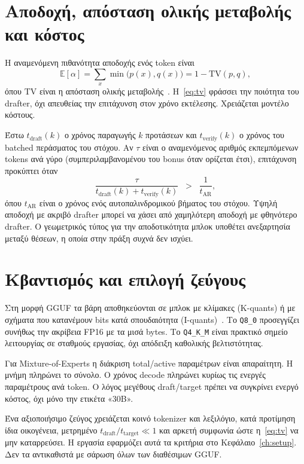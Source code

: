 \documentclass[a4paper,12pt]{report}
\theoremstyle{plain}
\theoremstyle{definition}
\theoremstyle{remark}
\begin{document}
\section{Αποδοχή, απόσταση ολικής μεταβολής και κόστος}

Η αναμενόμενη πιθανότητα αποδοχής ενός token είναι
\begin{equation}
  \mathbb{E}[\alpha]
  =\sum_{x}\min\bigl(p(x),q(x)\bigr)
  =1-\mathrm{TV}(p,q),
  \label{eq:tv}
\end{equation}
όπου \(\mathrm{TV}\) είναι η απόσταση ολικής μεταβολής~\cite{leviathan2023fast}.
Η~\eqref{eq:tv} φράσσει την ποιότητα του drafter, όχι απευθείας την επιτάχυνση
στον χρόνο εκτέλεσης. Χρειάζεται μοντέλο κόστους.

Έστω \(t_{\mathrm{draft}}(k)\) ο χρόνος παραγωγής \(k\) προτάσεων και
\(t_{\mathrm{verify}}(k)\) ο χρόνος του batched περάσματος του στόχου. Αν
\(\tau\) είναι ο αναμενόμενος αριθμός εκπεμπόμενων tokens ανά γύρο
(συμπεριλαμβανομένου του bonus όταν ορίζεται έτσι), επιτάχυνση προκύπτει όταν
\[
  \frac{\tau}{t_{\mathrm{draft}}(k)+t_{\mathrm{verify}}(k)}
  \;\;>\;\;
  \frac{1}{t_{\mathrm{AR}}},
\]
όπου \(t_{\mathrm{AR}}\) είναι ο χρόνος ενός αυτοπαλινδρομικού βήματος του
στόχου. Υψηλή αποδοχή με ακριβό drafter μπορεί να χάσει από χαμηλότερη αποδοχή
με φθηνότερο drafter. Ο γεωμετρικός τύπος για την αποδοτικότητα μπλοκ υποθέτει
ανεξαρτησία μεταξύ θέσεων, η οποία στην πράξη συχνά δεν ισχύει.

\section{Κβαντισμός και επιλογή ζεύγους}

Στη μορφή GGUF τα βάρη αποθηκεύονται σε μπλοκ με κλίμακες (K-quants) ή με
σχήματα που κατανέμουν bits κατά σπουδαιότητα (I-quants)~\cite{llamacpp}. Το
\texttt{Q8\_0} προσεγγίζει συνήθως την ακρίβεια FP16 με τα μισά bytes. Το
\texttt{Q4\_K\_M} είναι πρακτικό σημείο λειτουργίας σε σταθμούς εργασίας, όχι
απόδειξη καθολικής βελτιστότητας.

Για Mixture-of-Experts η διάκριση total/active παραμέτρων είναι απαραίτητη.
Η μνήμη πληρώνει το σύνολο. Ο χρόνος decode πληρώνει κυρίως τις ενεργές
παραμέτρους ανά token. Ο λόγος μεγέθους draft/target πρέπει να συγκρίνει
ενεργό κόστος, όχι μόνο την ετικέτα «30B».

Ένα αξιοποιήσιμο ζεύγος χρειάζεται κοινό tokenizer και λεξιλόγιο, κατά
προτίμηση ίδια οικογένεια, μετρημένο \(t_{\mathrm{draft}}/t_{\mathrm{target}}
\ll 1\) και αρκετή συμφωνία ώστε η~\eqref{eq:tv} να μην καταρρεύσει. Η
εργασία εφαρμόζει αυτά τα κριτήρια στο Κεφάλαιο~\ref{ch:setup}. Δεν τα
αντικαθιστά με σάρωση όλων των διαθέσιμων GGUF.
\end{document}
